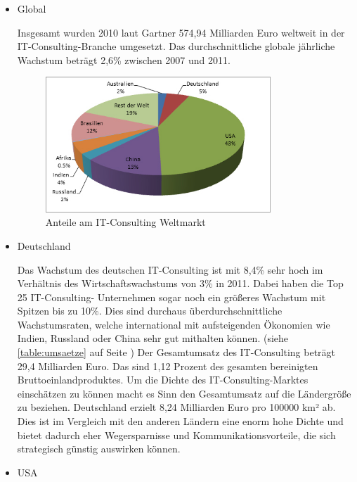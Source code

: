 \begin{itemize} 
\item {Global}

Insgesamt wurden 2010 laut Gartner 574,94 Milliarden Euro weltweit in der IT-Consulting-Branche umgesetzt. \cite{itConsultingGlobal} Das durchschnittliche globale jährliche Wachstum beträgt 2,6\% zwischen 2007 und 2011.\cite{globalGartner}

\begin{figure}
  \centering
  \includegraphics[width=0.8\textwidth]{images/global_revenue_share.jpg} 
  \caption{Anteile am IT-Consulting Weltmarkt} \label{fig:weltmarkt} 
\end{figure}


\item {Deutschland}

Das Wachstum des deutschen IT-Consulting ist mit 8,4\% sehr hoch im Verhältnis des Wirtschaftswachstums von 3\% in 2011.\cite{statGer2} Dabei haben die Top 25 IT-Consulting- Unternehmen sogar noch ein größeres Wachstum mit Spitzen bis zu 10\%. \cite[6]{topITB} Dies sind durchaus überdurchschnittliche Wachstumsraten, welche international mit aufsteigenden Ökonomien wie Indien, Russland oder China sehr gut mithalten können.  (siehe  \ref{table:umsaetze}  auf Seite \pageref{table:umsaetze}) Der Gesamtumsatz des IT-Consulting beträgt 29,4 Milliarden Euro.  Das sind 1,12 Prozent des gesamten bereinigten Bruttoeinlandproduktes. \cite{statGer} Um die Dichte des IT-Consulting-Marktes einschätzen zu können macht es Sinn den Gesamtumsatz auf die Ländergröße zu beziehen. 
Deutschland erzielt 8,24 Milliarden Euro pro 100000 km² ab. Dies ist im Vergleich mit den anderen Ländern eine enorm hohe Dichte und bietet dadurch eher Wegersparnisse und Kommunikationsvorteile, die sich strategisch günstig auswirken können. 

\item {USA}


\end{itemize}
